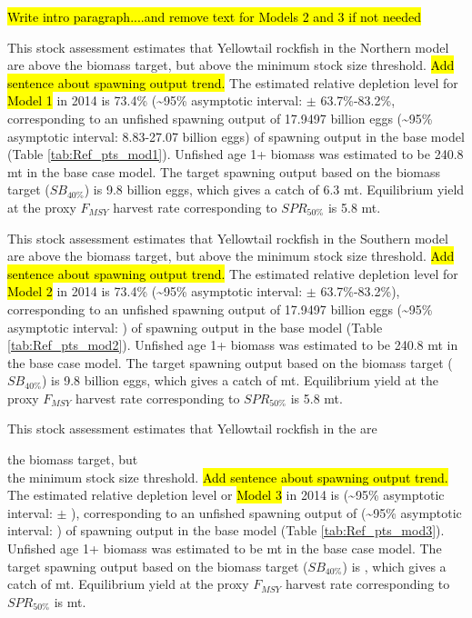 \documentclass[12pt,]{article}
\begin{document}
\hl{Write intro paragraph....and remove text for Models 2 and 3 if not needed}

This stock assessment estimates that Yellowtail rockfish in the Northern
model are above the biomass target, but above the minimum stock size
threshold. \hl{Add sentence about spawning output trend.} The estimated
relative depletion level for \hl{Model 1} in 2014 is 73.4\%
(\textasciitilde{}95\% asymptotic interval: \(\pm\) 63.7\%-83.2\%,
corresponding to an unfished spawning output of 17.9497 billion eggs
(\textasciitilde{}95\% asymptotic interval: 8.83-27.07 billion eggs) of
spawning output in the base model (Table \ref{tab:Ref_pts_mod1}).
Unfished age 1+ biomass was estimated to be 240.8 mt in the base case
model. The target spawning output based on the biomass target
(\(SB_{40\%}\)) is 9.8 billion eggs, which gives a catch of 6.3 mt.
Equilibrium yield at the proxy \(F_{MSY}\) harvest rate corresponding to
\(SPR_{50\%}\) is 5.8 mt.

This stock assessment estimates that Yellowtail rockfish in the Southern
model are above the biomass target, but above the minimum stock size
threshold. \hl{Add sentence about spawning output trend.} The estimated
relative depletion level for \hl{Model 2} in 2014 is 73.4\%
(\textasciitilde{}95\% asymptotic interval: \(\pm\) 63.7\%-83.2\%),
corresponding to an unfished spawning output of 17.9497 billion eggs
(\textasciitilde{}95\% asymptotic interval: ) of spawning output in the
base model (Table \ref{tab:Ref_pts_mod2}). Unfished age 1+ biomass was
estimated to be 240.8 mt in the base case model. The target spawning
output based on the biomass target (\(SB_{40\%}\)) is 9.8 billion eggs,
which gives a catch of mt. Equilibrium yield at the proxy \(F_{MSY}\)
harvest rate corresponding to \(SPR_{50\%}\) is 5.8 mt.

This stock assessment estimates that Yellowtail rockfish in the are

the biomass target, but\\
the minimum stock size threshold.
\hl{Add sentence about spawning output trend.} The estimated relative
depletion level or \hl{Model 3} in 2014 is (\textasciitilde{}95\%
asymptotic interval: \(\pm\) ), corresponding to an unfished spawning
output of (\textasciitilde{}95\% asymptotic interval: ) of spawning
output in the base model (Table \ref{tab:Ref_pts_mod3}). Unfished age 1+
biomass was estimated to be mt in the base case model. The target
spawning output based on the biomass target (\(SB_{40\%}\)) is , which
gives a catch of mt. Equilibrium yield at the proxy \(F_{MSY}\) harvest
rate corresponding to \(SPR_{50\%}\) is mt.
\end{document}
